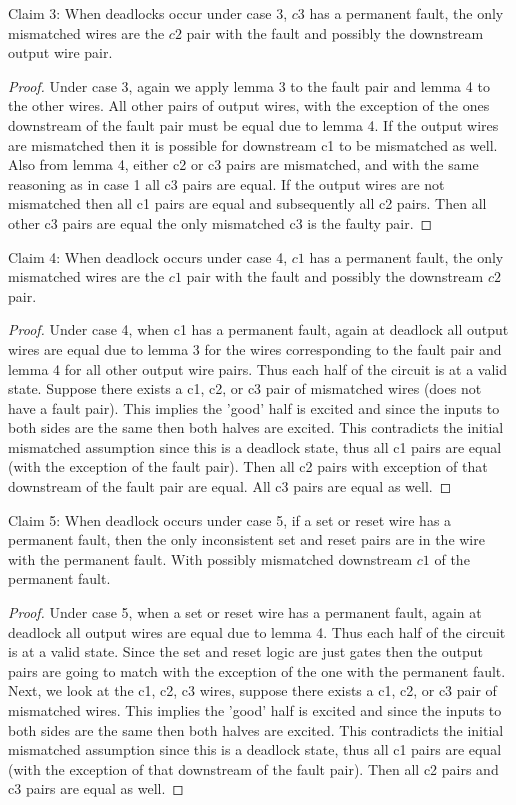 \documentclass{article}
\begin{document}
Claim 3:  When deadlocks occur under case 3, $c3$ has a permanent fault, the only mismatched wires are the $c2$ pair with the fault and possibly the downstream output wire pair.
\begin{proof}
Under case 3, again we apply lemma 3 to the fault pair and lemma 4 to the other wires.  All other pairs of output wires, with the exception of the ones downstream of the fault pair must be equal due to lemma 4.  If the output wires are mismatched then it is possible for downstream c1 to be mismatched as well.  Also from lemma 4, either c2 or c3 pairs are mismatched, and with the same reasoning as in case 1 all c3 pairs are equal.  If the output wires are not mismatched then all c1 pairs are equal and subsequently all c2 pairs.  Then all other c3 pairs are equal the only mismatched c3 is the faulty pair. \newline
\end{proof}
Claim 4:  When deadlock occurs under case 4, $c1$ has a permanent fault, the only mismatched wires are the $c1$ pair with the fault and possibly the downstream $c2$ pair.
\begin{proof}
Under case 4, when c1 has a permanent fault, again at deadlock all output wires are equal due to lemma 3 for the wires corresponding to the fault pair and lemma 4 for all other output wire pairs.  Thus each half of the circuit is at a valid state.  Suppose there exists a c1, c2, or c3 pair of mismatched wires (does not have a fault pair).  This implies the 'good' half is excited and since the inputs to both sides are the same then both halves are excited.  This contradicts the initial mismatched assumption since this is a deadlock state, thus all c1 pairs are equal (with the exception of the fault pair).  Then all c2 pairs with exception of that downstream of the fault pair are equal.  All c3 pairs are equal as well. \newline
\end{proof}
Claim 5:  When deadlock occurs under case 5, if a set or reset wire has a permanent fault, then the only inconsistent set and reset pairs are in the wire with the permanent fault.  With possibly mismatched downstream $c1$ of the permanent fault.
\begin{proof}
Under case 5, when a set or reset wire has a permanent fault, again at deadlock all output wires are equal due to lemma 4.  Thus each half of the circuit is at a valid state.  Since the set and reset logic are just gates then the output pairs are going to match with the exception of the one with the permanent fault.  Next, we look at the c1, c2, c3 wires, suppose there exists a c1, c2, or c3 pair of mismatched wires.  This implies the 'good' half is excited and since the inputs to both sides are the same then both halves are excited.  This contradicts the initial mismatched assumption since this is a deadlock state, thus all c1 pairs are equal (with the exception of that downstream of the fault pair).  Then all c2 pairs and c3 pairs are equal as well. \newline
\end{proof}
\end{document}
